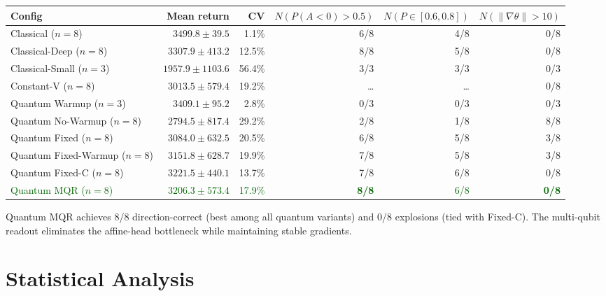 \documentclass[10pt,a4paper]{article}
\begin{document}
\begin{center}
\setlength{\tabcolsep}{5pt}
\begin{tabular}{lrrrrr}
\toprule
\textbf{Config} & \textbf{Mean return} & \textbf{CV} &
  $N(P(A{<}0){>}0.5)$ & $N(P{\in}[0.6,0.8])$ &
  $N(\|\nabla\theta\|{>}10)$ \\
\midrule
Classical ($n=8$)             & $3499.8 \pm 39.5$  &  1.1\% & 6/8 & 4/8 & 0/8 \\
Classical-Deep ($n=8$)        & $3307.9 \pm 413.2$ & 12.5\% & 8/8 & 5/8 & 0/8 \\
Classical-Small ($n=3$)       & $1957.9 \pm 1103.6$& 56.4\% & 3/3 & 3/3 & 0/3 \\
Constant-V ($n=8$)            & $3013.5 \pm 579.4$ & 19.2\% & \ldots & \ldots & 0/8 \\
\midrule
Quantum Warmup ($n=3$)        & $3409.1 \pm  95.2$ &  2.8\% & 0/3 & 0/3 & 0/3 \\
Quantum No-Warmup ($n=8$)     & $2794.5 \pm 817.4$ & 29.2\% & 2/8 & 1/8 & 8/8 \\
\midrule
Quantum Fixed ($n=8$)         & $3084.0 \pm 632.5$ & 20.5\% & 6/8 & 5/8 & 3/8 \\
Quantum Fixed-Warmup ($n=8$)  & $3151.8 \pm 628.7$ & 19.9\% & 7/8 & 5/8 & 3/8 \\
Quantum Fixed-C ($n=8$)       & $3221.5 \pm 440.1$ & 13.7\% & 7/8 & 6/8 & 0/8 \\
\textcolor{darkgreen}{Quantum MQR ($n=8$)}
                               & \textcolor{darkgreen}{$3206.3 \pm 573.4$}
                               & \textcolor{darkgreen}{17.9\%}
                               & \textcolor{darkgreen}{\textbf{8/8}}
                               & \textcolor{darkgreen}{6/8}
                               & \textcolor{darkgreen}{\textbf{0/8}} \\
\bottomrule
\end{tabular}
\end{center}

Quantum MQR achieves 8/8 direction-correct (best among all quantum variants)
and 0/8 explosions (tied with Fixed-C). The multi-qubit readout eliminates the
affine-head bottleneck while maintaining stable gradients.

\section{Statistical Analysis}
\end{document}
